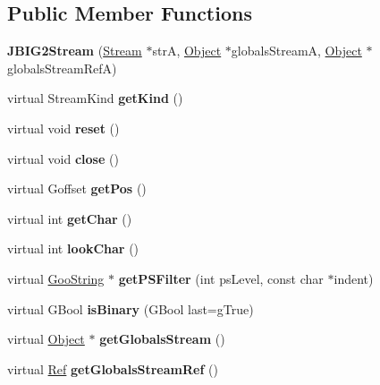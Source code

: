 \subsection*{Public Member Functions}
\begin{DoxyCompactItemize}
\item 
\mbox{\label{class_j_b_i_g2_stream_ac34bb8d36b97d0e8703c342359971c03}} 
{\bfseries J\+B\+I\+G2\+Stream} (\hyperlink{class_stream}{Stream} $\ast$strA, \hyperlink{class_object}{Object} $\ast$globals\+StreamA, \hyperlink{class_object}{Object} $\ast$globals\+Stream\+RefA)
\item 
\mbox{\label{class_j_b_i_g2_stream_ae1fc2af6b774cf724dd2068872cdb937}} 
virtual Stream\+Kind {\bfseries get\+Kind} ()
\item 
\mbox{\label{class_j_b_i_g2_stream_abb8b2583a0e19f4acdaf0968893e222b}} 
virtual void {\bfseries reset} ()
\item 
\mbox{\label{class_j_b_i_g2_stream_a0121fbc68e0b66e58065b826b2d2b595}} 
virtual void {\bfseries close} ()
\item 
\mbox{\label{class_j_b_i_g2_stream_aa3a4ff88a8a467740d0ca9eba887241c}} 
virtual Goffset {\bfseries get\+Pos} ()
\item 
\mbox{\label{class_j_b_i_g2_stream_aea31f583bee9bd5db44398c0b208e22f}} 
virtual int {\bfseries get\+Char} ()
\item 
\mbox{\label{class_j_b_i_g2_stream_aedbe3f11f6031323527d59dc5205187b}} 
virtual int {\bfseries look\+Char} ()
\item 
\mbox{\label{class_j_b_i_g2_stream_ae87cddd95516d32cc2c21af1585ff188}} 
virtual \hyperlink{class_goo_string}{Goo\+String} $\ast$ {\bfseries get\+P\+S\+Filter} (int ps\+Level, const char $\ast$indent)
\item 
\mbox{\label{class_j_b_i_g2_stream_a37c450d783db2c62db86a7e9e420e2b0}} 
virtual G\+Bool {\bfseries is\+Binary} (G\+Bool last=g\+True)
\item 
\mbox{\label{class_j_b_i_g2_stream_afeb891f95eba32722cb184b30763540e}} 
virtual \hyperlink{class_object}{Object} $\ast$ {\bfseries get\+Globals\+Stream} ()
\item 
\mbox{\label{class_j_b_i_g2_stream_a31f52d801291f503e06c1bce45785b63}} 
virtual \hyperlink{struct_ref}{Ref} {\bfseries get\+Globals\+Stream\+Ref} ()
\end{DoxyCompactItemize}
